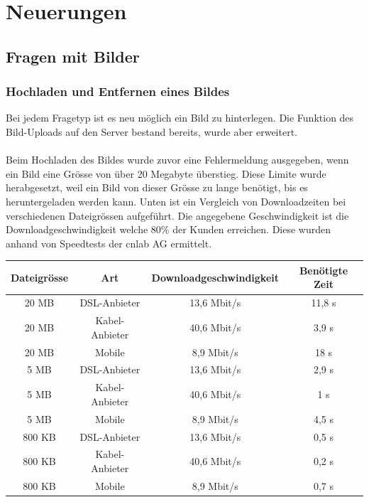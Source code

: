 \section{Neuerungen}

\subsection{Fragen mit Bilder}

\subsubsection{Hochladen und Entfernen eines Bildes}
Bei jedem Fragetyp ist es neu möglich ein Bild zu hinterlegen. Die Funktion des Bild-Uploads auf den Server bestand bereits, wurde aber erweitert.
\\
\\
Beim Hochladen des Bildes wurde zuvor eine Fehlermeldung ausgegeben, wenn ein Bild eine Grösse von über 20 Megabyte überstieg. Diese Limite wurde herabgesetzt, weil ein Bild von dieser Grösse zu lange benötigt, bis es heruntergeladen werden kann. Unten ist ein Vergleich von Downloadzeiten bei verschiedenen Dateigrössen aufgeführt. Die angegebene Geschwindigkeit ist die Downloadgeschwindigkeit welche 80\% der Kunden erreichen. Diese wurden anhand von Speedtests der cnlab AG \cite{cnlab_speedtest} ermittelt. \\


\begin{tabular}{|c|c|c|c|}
	\hline 
	Dateigrösse & Art & Downloadgeschwindigkeit & Benötigte Zeit \\ 
	\hline 
	20 MB & DSL-Anbieter & 13,6 Mbit/s & 11,8 s \\ 
	\hline 
	20 MB & Kabel-Anbieter & 40,6 Mbit/s & 3,9 s \\ 
	\hline 
	20 MB & Mobile & 8,9 Mbit/s & 18 s \\ 
	\hline 
	5 MB & DSL-Anbieter & 13,6 Mbit/s & 2,9 s \\ 
	\hline 
	5 MB & Kabel-Anbieter & 40,6 Mbit/s & 1 s \\ 
	\hline 
	5 MB & Mobile & 8,9 Mbit/s & 4,5 s \\ 
	\hline 
	800 KB & DSL-Anbieter & 13,6 Mbit/s & 0,5 s \\ 
	\hline 
	800 KB & Kabel-Anbieter & 40,6 Mbit/s & 0,2 s \\ 
	\hline 
	800 KB & Mobile & 8,9 Mbit/s & 0,7 s \\ 
	\hline 
\end{tabular}\\

